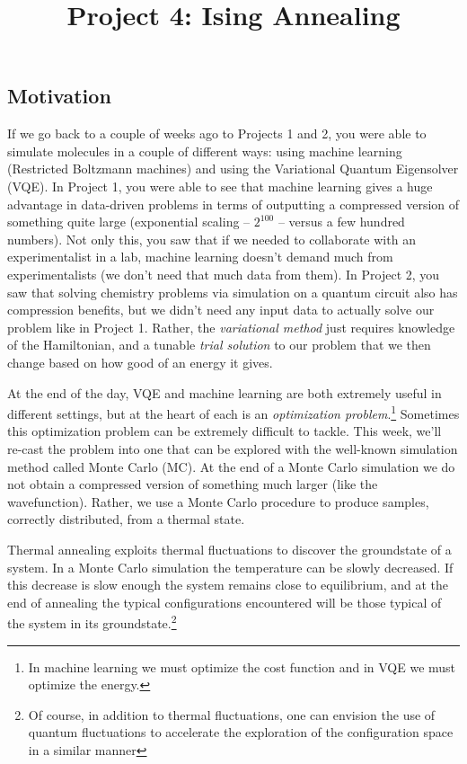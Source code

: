 \documentclass[12pt]{article}
\title{Project 4: Ising Annealing}
\begin{document}
\maketitle

\thispagestyle{empty}

\subsection*{Motivation}

If we go back to a couple of weeks ago to Projects 1 and 2, you were able to simulate molecules in a couple of different ways: using machine learning (Restricted Boltzmann machines) and using the Variational Quantum Eigensolver (VQE). In Project 1, you were able to see that machine learning gives a huge advantage in data-driven problems in terms of outputting a compressed version of something quite large (exponential scaling -- $2^{100}$ -- versus a few hundred numbers). Not only this, you saw that if we needed to collaborate with an experimentalist in a lab, machine learning doesn't  demand much from experimentalists (we don't need that much data from them). In Project 2, you saw that solving chemistry problems via simulation on a quantum circuit also has compression benefits, but we didn't need any input data to actually solve our problem like in Project 1. Rather, the {\it variational method} just requires knowledge of the Hamiltonian, and a tunable {\it trial solution} to our problem that we then change based on how good of an energy it gives.

At the end of the day, VQE and machine learning are both extremely useful in different settings, but at the heart of each is an {\it optimization problem}.\footnote{In machine learning we must optimize the cost function and in VQE we must optimize the energy.} Sometimes this optimization problem can be extremely difficult to tackle.
This week, we'll re-cast the problem into one that can be explored with the well-known simulation method called Monte Carlo (MC).
At the end of a Monte Carlo simulation we do not obtain a compressed version of something much larger (like the wavefunction).
Rather, we use a Monte Carlo procedure to produce samples, correctly distributed, from a thermal state.

Thermal annealing exploits thermal fluctuations to discover the groundstate of a system. In a Monte Carlo simulation the temperature can be slowly decreased. If this decrease is slow enough the system remains close to equilibrium, and at the end of annealing the typical configurations encountered will be those typical of the system in its groundstate.\footnote{Of course, in addition to thermal fluctuations, one can envision the use of quantum fluctuations to accelerate the exploration of the configuration space in a similar manner}
\end{document}
